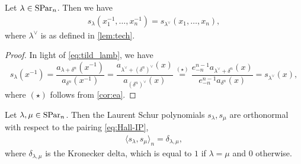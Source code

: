 \documentclass[11pt]{amsart}
\begin{document}
    \begin{prop}\label{prop:relsch}
        Let $\lambda \in \mathrm{SPar}_n$. Then we have
        \begin{align}
            s_\lambda(x_1^{-1}, \dots, x_n^{-1}) = s_{\lambda^\vee}(x_1,\dots,x_n),
        \end{align}
        where $\lambda^\vee$ is as defined in \cref{lem:tech}.
    \end{prop}
    \begin{proof}
        In light of \cref{eq:tild_lamb}, we have
        \[
        s_\lambda (x^{-1}) = \frac{a_{\lambda + \delta^n} (x^{-1})}{a_{\delta^n}(x^{-1})} = \frac{a_{\lambda^\vee + \left(\delta^n\right)^\vee}(x)}{a_{\left(\delta^n\right)^\vee}(x)} \overset{(\star)}{=} \frac{e_{-n}^{n - 1}a_{\lambda^\vee + \delta^n}(x)}{e_{-n}^{n -1}a_{\delta^n}(x)}  = s_{\lambda^\vee}(x),
        \]     
        where $(\star)$ follows from \cref{cor:ea}.
    \end{proof}
     \begin{prop}\label{prop:SchurOGB}
         Let $\lambda, \mu \in \mathrm{SPar}_n$. Then the Laurent Schur polynomials $s_{\lambda}, s_{\mu}$ are orthonormal with respect to the pairing \cref{eq:Hall-IP},
         \begin{align}
             \langle s_\lambda, s_\mu \rangle_n=\delta_{\lambda, \mu}, \label{eq:SchurOGB}
         \end{align}
         where \(\delta_{\lambda, \mu}\) is the Kronecker delta, which is equal to \(1\) if \(\lambda = \mu\) and 0 otherwise.
     \end{prop}
\end{document}
